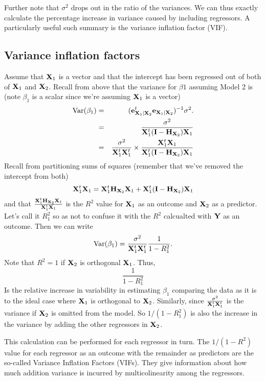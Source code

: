 Further note that $\sigma^2$ drops out in the ratio of the variances. We can thus
exactly calculate the percentage increase in variance caused by including regressors.
A particularly useful such summary is the variance inflation factor (VIF). 

\subsection{Variance inflation factors}
Assume that $\mathbf{X}_1$ is a vector and that the intercept has been regressed out of 
both of $\mathbf{X}_1$ and $\mathbf{X}_2$. Recall from above that the variance for $\beta1$ assuming
Model 2 is (note $\beta_1$ is a scalar since we're assuming $\mathbf{X}_1$ is a vector)
\begin{eqnarray*}
\mbox{Var}(\beta_1) & = & (\mathbf{e}_{\mathbf{X}_1 | \mathbf{X}_2}^t \mathbf{e}_{\mathbf{X}_1 | \mathbf{X}_2})^{-1} \sigma^2.\\
& = & \frac{\sigma^2}{\mathbf{X}_1^t (\mathbf{I} - \mathbf{H}_{\mathbf{X}_2}) \mathbf{X}_1} \\
& = & \frac{\sigma^2}{\mathbf{X}_1^t \mathbf{X}_1^t} \times \frac{\mathbf{X}_1^t \mathbf{X}_1}{\mathbf{X}_1^t (\mathbf{I} - \mathbf{H}_{\mathbf{X}_2}) \mathbf{X}_1}
\end{eqnarray*}
Recall from partitioning sums of squares (remember that we've removed the intercept from both)
$$
\mathbf{X}_1^t\mathbf{X}_1 = \mathbf{X}_1^t \mathbf{H}_{\mathbf{X}_2} \mathbf{X}_1 + \mathbf{X}_1^t (\mathbf{I} - \mathbf{H}_{\mathbf{X}_2}) \mathbf{X}_1
$$
and that $\frac{\mathbf{X}_1^t \mathbf{H}_{\mathbf{X}_2} \mathbf{X}_1}{\mathbf{X}_1^t\mathbf{X}_1}$ is the $R^2$ value for $\mathbf{X}_1$
as an outcome and $\mathbf{X}_2$ as a predictor. Let's call it $R^2_1$ so as not to confuse
it with the $R^2$ calcualted with $\mathbf{Y}$ as an outcome. Then we can write
$$
\mbox{Var}(\beta_1) =  \frac{\sigma^2}{\mathbf{X}_1^t \mathbf{X}_1^t} \frac{1}{1 - R^2_1}.
$$
Note that $R^2 = 1$ if $\mathbf{X}_2$ is orthogonal $\mathbf{X}_1$. Thus,
$$
\frac{1}{1 - R^2_1}
$$
Is the relative increase in variability in estimating $\beta_1$
comparing the data as it is to the ideal case where $\mathbf{X}_1$ is orthogonal to $\mathbf{X}_2$. 
Similarly, since $\frac{\sigma^2}{\mathbf{X}_1^t \mathbf{X}_1^t}$ is the variance if $\mathbf{X}_2$ is omitted
from the model. So $1 / (1 - R^2_1)$ is also the increase in the variance by adding the
other regressors in $\mathbf{X}_2$.

This calculation can be performed for each regressor in turn. The $1 / (1 - R^2)$ value
for each regressor as an outcome with the remainder as predictors are the so-called
Variance Inflation Factors (VIFs). They give information about how much addition
variance is incurred by multicolinearity among the regressors.


